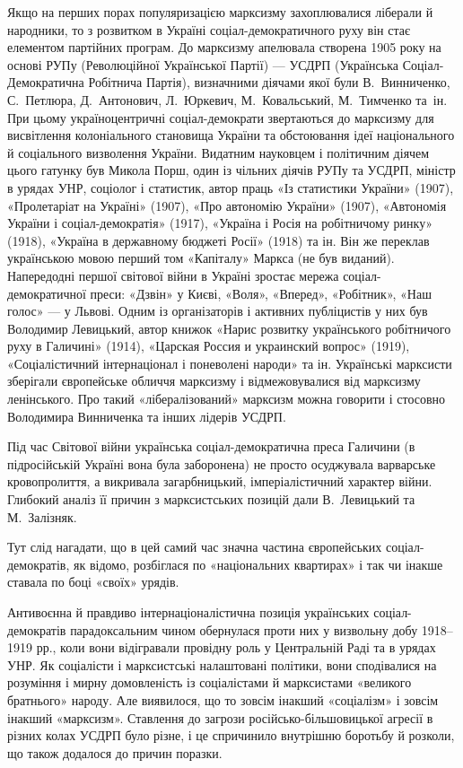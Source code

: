 Якщо на перших порах популяризацією марксизму захоплювалися ліберали 
й народники, то з розвитком в Україні соціал-демократичного руху він 
стає елементом партійних програм. До марксизму апелювала створена 1905 
року на основі РУПу (Революційної Української Партії) — УСДРП 
(Українська Соціал-Демократична Робітнича Партія), визначними діячами 
якої були В.~Винниченко, С.~Петлюра, Д.~Антонович, Л.~Юркевич,
М.~Ковальський, М.~Тимченко та~ін. При цьому україноцентричні 
соціал-демократи звертаються до марксизму для висвітлення 
колоніального становища України та обстоювання ідеї національного й 
соціального визволення України. Видатним науковцем і політичним 
діячем цього гатунку був Микола Порш, один із чільних діячів РУПу та 
УСДРП, міністр в урядах УНР, соціолог і статистик, автор праць «Із 
статистики України» (1907), «Пролетаріат на Україні» (1907), «Про автономію 
України» (1907), «Автономія України і соціал-демократія» (1917), «Україна і 
Росія на робітничому ринку» (1918), «Україна в державному бюджеті Росії» 
(1918) та ін. Він же переклав українською мовою перший том «Капіталу» 
Маркса (не був виданий). Напередодні першої світової війни в Україні 
зростає мережа соціал-демократичної преси: «Дзвін» у Києві, «Воля», 
«Вперед», «Робітник», «Наш голос» — у Львові. Одним із організаторів і 
активних публіцистів у них був Володимир Левицький, автор книжок 
«Нарис розвитку українського робітничого руху в Галичині» (1914), 
«Царская Россия и украинский вопрос» (1919), «Соціалістичний 
інтернаціонал і поневолені народи» та ін. Українські марксисти 
зберігали європейське обличчя марксизму і відмежовувалися від 
марксизму ленінського. Про такий «лібералізований» марксизм можна 
говорити і стосовно Володимира Винниченка та інших лідерів УСДРП. 


Під час Світової війни українська соціал-демократична преса Галичини 
(в підросійській Україні вона була заборонена) не просто осуджувала 
варварське кровопролиття, а викривала загарбницький, 
імперіалістичний характер війни. Глибокий аналіз її причин з 
марксистських позицій дали В.~Левицький та М.~Залізняк. 


Тут слід нагадати, що в цей самий час значна частина європейських 
соціал-демократів, як відомо, розбіглася по «національних квартирах» 
і так чи інакше ставала по боці «своїх» урядів. 


Антивоєнна й правдиво інтернаціоналістична позиція українських 
соціал-демократів парадоксальним чином обернулася проти них у 
визвольну добу 1918--1919 рр., коли вони відігравали провідну роль у 
Центральній Раді та в урядах УНР. Як соціалісти і марксистські 
налаштовані політики, вони сподівалися на розуміння і мирну 
домовленість із соціалістами й марксистами «великого братнього» 
народу. Але виявилося, що то зовсім інакший «соціалізм» і зовсім 
інакший «марксизм». Ставлення до загрози російсько-більшовицької 
агресії в різних колах УСДРП було різне, і це спричинило внутрішню 
боротьбу й розколи, що також додалося до причин поразки. 


